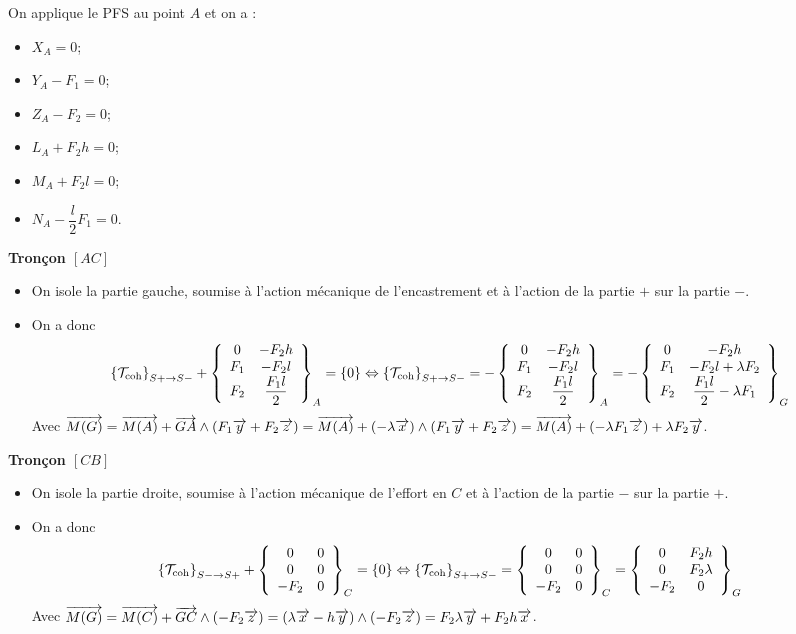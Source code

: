\documentclass[10pt,fleqn]{article} %
\begin{document}
\begin{multicols}{2}
On applique le PFS au point $A$ et on a : 
\begin{itemize}
\item $X_A=0$;
\item $Y_A - F_1 = 0$;
\item $Z_A - F_2 = 0$;
\item $L_A +F_2h= 0$;
\item $M_A +F_2l=0 $;
\item $N_A -\dfrac{l}{2}F_1=0 $.
\end{itemize}

\textbf{Tronçon $[AC]$}
\begin{itemize}
\item On isole la partie gauche, soumise à l'action mécanique de l'encastrement et à l'action de la partie $+$ sur la partie $-$.
\item On a donc $$
\torseurscoh_{S+\rightarrow S-} +
 \torseurcol{0}{F_1}{F_2}{-F_2h}{-F_2l}{\dfrac{F_1l}{2}}{A} 
 = \{0\} 
 \Leftrightarrow 
 \torseurscoh_{S+\rightarrow S-} 
 =
 -\torseurcol{0}{F_1}{F_2}{-F_2h}{-F_2l}{\dfrac{F_1l}{2}}{A} 
 =
 -\torseurcol{0}{F_1}{F_2}{-F_2h}{-F_2l+\lambda F_2}{\dfrac{F_1l}{2}-\lambda F_1}{G} 
$$
Avec $\vect{M(G)} 
= \vect{M(A)}+\vect{GA}\wedge\left(F_1 \vect{y}+F_2 \vect{z}\right)
= \vect{M(A)}+\left(- \lambda \vect{x}\right)\wedge\left(F_1 \vect{y}+F_2 \vect{z}\right)
= \vect{M(A)}+\left(- \lambda F_1 \vect{z}\right)+\lambda F_2 \vect{y}
$.
\end{itemize}

\textbf{Tronçon $[CB]$}

\begin{itemize}
\item On isole la partie droite, soumise à l'action mécanique de l'effort en $C$ et à l'action de la partie $-$ sur la partie $+$.
\item On a donc $$
\torseurscoh_{S-\rightarrow S+} +
 \torseurcol{0}{0}{-F_2}{0}{0}{0}{C} 
 = \{0\} 
 \Leftrightarrow 
 \torseurscoh_{S+\rightarrow S-} 
 =
 \torseurcol{0}{0}{-F_2}{0}{0}{0}{C} 
 =
  \torseurcol{0}{0}{-F_2}{F_2 h}{F_2 \lambda}{0}{G} 
$$
Avec $\vect{M(G)} 
= \vect{M(C)}+\vect{GC}\wedge\left(-F_2 \vect{z}\right)
= \left(\lambda \vect{x}-h\vect{y} \right)\wedge\left(-F_2 \vect{z}\right)
= F_2\lambda \vect{y}+F_2 h\vect{x} 
$.
\end{itemize}


\end{multicols}
\end{document}
